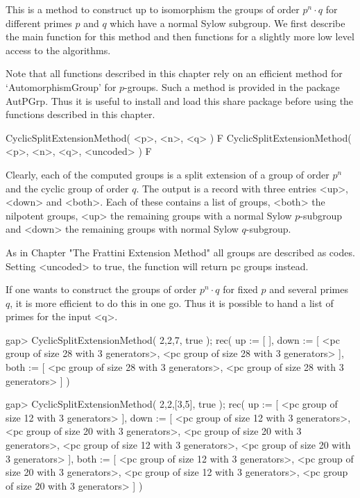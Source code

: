 


This is a method to construct up to isomorphism the groups of order
$p^n \cdot q$ for different primes $p$ and $q$ which have a normal
Sylow subgroup. We first describe the main function for this method
and then functions for a slightly more low level access to the
algorithms. 

Note that all functions described in this chapter rely on an
efficient method for `AutomorphismGroup' for $p$-groups. Such
a method is provided in the package AutPGrp.
Thus it is useful to install and load this share package before
using the functions described in this chapter.


\> CyclicSplitExtensionMethod( <p>, <n>, <q> ) F
\> CyclicSplitExtensionMethod( <p>, <n>, <q>, <uncoded> ) F

Clearly, each of the computed groups is a split extension of a group
of order $p^n$ and the cyclic group of order $q$. The output is a
record with three entries <up>, <down> and <both>. Each of these 
contains a list of groups, <both> the nilpotent groups, <up> the 
remaining groups with a normal Sylow $p$-subgroup and <down> the
remaining groups with normal Sylow $q$-subgroup.

As in Chapter "The Frattini Extension Method" all groups are
described as codes. Setting <uncoded> to true, the function
will return pc groups instead.

If one wants to construct the groups of order $p^n \cdot q$
for fixed $p$ and several primes $q$, it is more efficient to
do this in one go. Thus it is possible to hand a list of primes
for the input <q>.

\beginexample
gap> CyclicSplitExtensionMethod( 2,2,7, true );    
rec( up := [  ], 
  down  := [ <pc group of size 28 with 3 generators>, 
             <pc group of size 28 with 3 generators> ], 
  both  := [ <pc group of size 28 with 3 generators>, 
             <pc group of size 28 with 3 generators> ] )

gap> CyclicSplitExtensionMethod( 2,2,[3,5], true );
rec( up := [ <pc group of size 12 with 3 generators> ], 
  down  := [ <pc group of size 12 with 3 generators>, 
             <pc group of size 20 with 3 generators>, 
             <pc group of size 20 with 3 generators>, 
             <pc group of size 12 with 3 generators>, 
             <pc group of size 20 with 3 generators> ], 
  both  := [ <pc group of size 12 with 3 generators>, 
             <pc group of size 20 with 3 generators>, 
             <pc group of size 12 with 3 generators>, 
             <pc group of size 20 with 3 generators> ] )
\endexample

